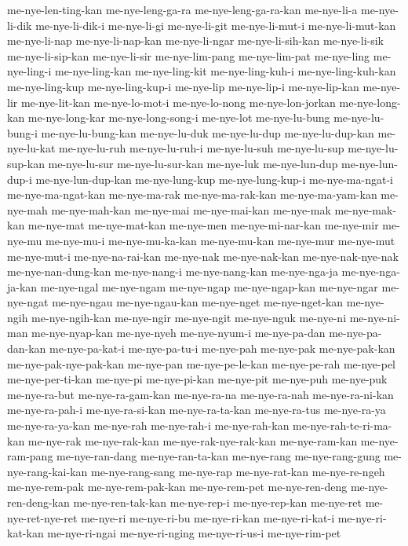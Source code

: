 {me-nye-len-ting-kan me-nye-leng-ga-ra me-nye-leng-ga-ra-kan me-nye-li-a
me-nye-li-dik me-nye-li-dik-i me-nye-li-gi me-nye-li-git me-nye-li-mut-i
me-nye-li-mut-kan me-nye-li-nap me-nye-li-nap-kan me-nye-li-ngar
me-nye-li-sih-kan me-nye-li-sik me-nye-li-sip-kan me-nye-li-sir
me-nye-lim-pang me-nye-lim-pat me-nye-ling me-nye-ling-i me-nye-ling-kan
me-nye-ling-kit me-nye-ling-kuh-i me-nye-ling-kuh-kan me-nye-ling-kup
me-nye-ling-kup-i me-nye-lip me-nye-lip-i me-nye-lip-kan me-nye-lir
me-nye-lit-kan me-nye-lo-mot-i me-nye-lo-nong me-nye-lon-jorkan
me-nye-long-kan me-nye-long-kar me-nye-long-song-i me-nye-lot
me-nye-lu-bung me-nye-lu-bung-i me-nye-lu-bung-kan me-nye-lu-duk
me-nye-lu-dup me-nye-lu-dup-kan me-nye-lu-kat me-nye-lu-ruh
me-nye-lu-ruh-i me-nye-lu-suh me-nye-lu-sup me-nye-lu-sup-kan
me-nye-lu-sur me-nye-lu-sur-kan me-nye-luk me-nye-lun-dup me-nye-lun-dup-i
me-nye-lun-dup-kan me-nye-lung-kup me-nye-lung-kup-i me-nye-ma-ngat-i
me-nye-ma-ngat-kan me-nye-ma-rak me-nye-ma-rak-kan me-nye-ma-yam-kan
me-nye-mah me-nye-mah-kan me-nye-mai me-nye-mai-kan me-nye-mak
me-nye-mak-kan me-nye-mat me-nye-mat-kan me-nye-men me-nye-mi-nar-kan
me-nye-mir me-nye-mu me-nye-mu-i me-nye-mu-ka-kan me-nye-mu-kan me-nye-mur
me-nye-mut me-nye-mut-i me-nye-na-rai-kan me-nye-nak me-nye-nak-kan
me-nye-nak-nye-nak me-nye-nan-dung-kan me-nye-nang-i me-nye-nang-kan
me-nye-nga-ja me-nye-nga-ja-kan me-nye-ngal me-nye-ngam me-nye-ngap
me-nye-ngap-kan me-nye-ngar me-nye-ngat me-nye-ngau me-nye-ngau-kan
me-nye-nget me-nye-nget-kan me-nye-ngih me-nye-ngih-kan me-nye-ngir
me-nye-ngit me-nye-nguk me-nye-ni me-nye-ni-man me-nye-nyap-kan
me-nye-nyeh me-nye-nyum-i me-nye-pa-dan me-nye-pa-dan-kan me-nye-pa-kat-i
me-nye-pa-tu-i me-nye-pah me-nye-pak me-nye-pak-kan me-nye-pak-nye-pak-kan
me-nye-pan me-nye-pe-le-kan me-nye-pe-rah me-nye-pel me-nye-per-ti-kan
me-nye-pi me-nye-pi-kan me-nye-pit me-nye-puh me-nye-puk me-nye-ra-but
me-nye-ra-gam-kan me-nye-ra-na me-nye-ra-nah me-nye-ra-ni-kan
me-nye-ra-pah-i me-nye-ra-si-kan me-nye-ra-ta-kan me-nye-ra-tus
me-nye-ra-ya me-nye-ra-ya-kan me-nye-rah me-nye-rah-i me-nye-rah-kan
me-nye-rah-te-ri-ma-kan me-nye-rak me-nye-rak-kan me-nye-rak-nye-rak-kan
me-nye-ram-kan me-nye-ram-pang me-nye-ran-dang me-nye-ran-ta-kan
me-nye-rang me-nye-rang-gung me-nye-rang-kai-kan me-nye-rang-sang
me-nye-rap me-nye-rat-kan me-nye-re-ngeh me-nye-rem-pak me-nye-rem-pak-kan
me-nye-rem-pet me-nye-ren-deng me-nye-ren-deng-kan me-nye-ren-tak-kan
me-nye-rep-i me-nye-rep-kan me-nye-ret me-nye-ret-nye-ret me-nye-ri
me-nye-ri-bu me-nye-ri-kan me-nye-ri-kat-i me-nye-ri-kat-kan
me-nye-ri-ngai me-nye-ri-nging me-nye-ri-us-i me-nye-rim-pet
}
